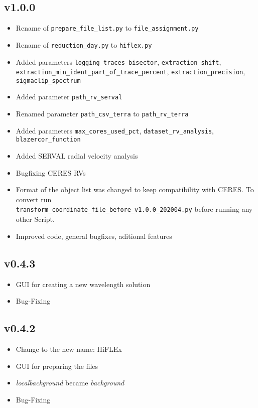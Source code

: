 \documentclass[10pt,a4paper]{article}
\begin{document}
\subsection*{v1.0.0}
\begin{itemize}\setlength\itemsep{0em}
  \item Rename of \verb|prepare_file_list.py| to \verb|file_assignment.py|
  \item Rename of \verb|reduction_day.py| to \verb|hiflex.py|
  \item Added parameters \verb|logging_traces_bisector|, \verb|extraction_shift|,\\ \verb|extraction_min_ident_part_of_trace_percent|, \verb|extraction_precision|, \verb|sigmaclip_spectrum|
  \item Added parameter \verb|path_rv_serval|
  \item Renamed parameter \verb|path_csv_terra| to \verb|path_rv_terra|
  \item Added parameters \verb|max_cores_used_pct|, \verb|dataset_rv_analysis|, \verb|blazercor_function|
  \item Added SERVAL radial velocity analysis
  \item Bugfixing CERES RVs
  \item Format of the object list was changed to keep compatibility with CERES. To convert run \\ \verb|transform_coordinate_file_before_v1.0.0_202004.py| before running any other Script. %
  \item Improved code, general bugfixes, aditional features
\end{itemize}

\subsection*{v0.4.3}
\begin{itemize}\setlength\itemsep{0em}
  \item GUI for creating a new wavelength solution
  \item Bug-Fixing
\end{itemize}

\subsection*{v0.4.2}
\begin{itemize}\setlength\itemsep{0em}
  \item Change to the new name: HiFLEx
  \item GUI for preparing the files
  \item \textit{localbackground} became \textit{background}
  \item Bug-Fixing
\end{itemize}
\end{document}
